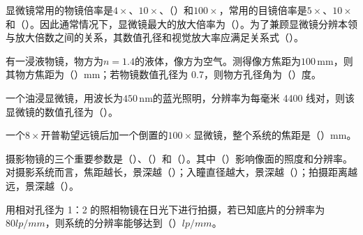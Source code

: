 \documentclass[standard, analysis, notocnum]{ExBook}
\newcommand{\answerarea}[1][8cm]{%
  \par\vspace{2mm}%
  \noindent{\color{themeColor!35}\rule{\linewidth}{0.4pt}}\par
  \noindent\begin{minipage}[t][#1][t]{\linewidth}\vspace{0pt}\end{minipage}\par
  \noindent{\color{themeColor!35}\rule{\linewidth}{0.4pt}}\par
}
\begin{document}
\begin{qitems}
\begin{bbox}
\end{bbox}
\begin{bbox}
\qitem 显微镜常用的物镜倍率是$4\times$、$10\times$、（\hspace{1.6em}）和$100\times$，常用的目镜倍率是$5\times$、$10\times$和（\hspace{1.6em}）。因此通常情况下，显微镜最大的放大倍率为（\hspace{1.6em}）。为了兼顾显微镜分辨本领与放大倍数之间的关系，其数值孔径和视觉放大率应满足关系式（\hspace{1.6em}）。
\answerarea[3.5cm]
\end{bbox}
\begin{bbox}
\qitem 有一浸液物镜，物方为$n=1.4$的液体，像方为空气。测得像方焦距为$100\,\mathrm{mm}$，则其物方焦距为（\hspace{1.6em}）mm；若物镜数值孔径为 0.7，则物方孔径角为（\hspace{1.6em}）度。
\answerarea[3.5cm]
\end{bbox}
\begin{bbox}
\qitem 一个油浸显微镜，用波长为$450\,\mathrm{nm}$的蓝光照明，分辨率为每毫米 4400 线对，则该显微镜的数值孔径为（\hspace{1.6em}）。
\answerarea[3.5cm]
\end{bbox}
\begin{bbox}
\qitem 一个$8\times$开普勒望远镜后加一个倒置的$100\times$显微镜，整个系统的焦距是（\hspace{1.6em}）mm。
\answerarea[3.5cm]
\end{bbox}
\begin{bbox}
\qitem 摄影物镜的三个重要参数是（\hspace{1.6em}）、（\hspace{1.6em}）和（\hspace{1.6em}）。其中（\hspace{1.6em}）影响像面的照度和分辨率。对摄影系统而言，焦距越长，景深越（\hspace{1.6em}）；入瞳直径越大，景深越（\hspace{1.6em}）；拍摄距离越远，景深越（\hspace{1.6em}）。
\answerarea[3.5cm]
\end{bbox}
\begin{bbox}
\qitem 用相对孔径为 1：2 的照相物镜在日光下进行拍摄，若已知底片的分辨率为$80lp/mm$，则系统的分辨率能够达到（\hspace{1.6em}）$lp/mm$。
\answerarea[3.5cm]
\end{bbox}
\begin{bbox}

\end{bbox}
\end{qitems}
\end{document}

